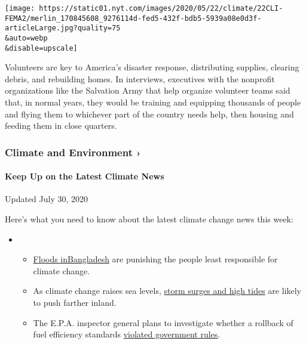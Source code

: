 \texttt{[image: https://static01.nyt.com/images/2020/05/22/climate/22CLI-FEMA2/merlin\_170845608\_9276114d-fed5-432f-bdb5-5939a08e0d3f-articleLarge.jpg?quality=75\\\&auto=webp\\\&disable=upscale]}

Volunteers are key to America's disaster response, distributing
supplies, clearing debris, and rebuilding homes. In interviews,
executives with the nonprofit organizations like the Salvation Army that
help organize volunteer teams said that, in normal years, they would be
training and equipping thousands of people and flying them to whichever
part of the country needs help, then housing and feeding them in close
quarters.

\href{https://www.nytimes.com/section/climate?action=click\&pgtype=Article\&state=default\&region=MAIN_CONTENT_1\&context=storylines_keepup}{}

\hypertarget{climate-and-environment-}{%
\subsubsection{Climate and Environment
›}\label{climate-and-environment-}}

\hypertarget{keep-up-on-the-latest-climate-news}{%
\paragraph{Keep Up on the Latest Climate
News}\label{keep-up-on-the-latest-climate-news}}

Updated July 30, 2020

Here's what you need to know about the latest climate change news this
week:

\begin{itemize}
\item
  \begin{itemize}
  \tightlist
  \item
    \href{https://www.nytimes.com/2020/07/30/climate/bangladesh-floods.html?action=click\&pgtype=Article\&state=default\&region=MAIN_CONTENT_1\&context=storylines_keepup}{Floods
    in}\href{https://www.nytimes.com/2020/07/30/climate/bangladesh-floods.html?action=click\&pgtype=Article\&state=default\&region=MAIN_CONTENT_1\&context=storylines_keepup}{Bangladesh}
    are punishing the people least responsible for climate change.
  \item
    As climate change raises sea levels,
    \href{https://www.nytimes.com/2020/07/30/climate/sea-level-inland-floods.html?action=click\&pgtype=Article\&state=default\&region=MAIN_CONTENT_1\&context=storylines_keepup}{storm
    surges and high tides} are likely to push farther inland.
  \item
    The E.P.A. inspector general plans to investigate whether a rollback
    of fuel efficiency standards
    \href{https://www.nytimes.com/2020/07/27/climate/trump-fuel-efficiency-rule.html?action=click\&pgtype=Article\&state=default\&region=MAIN_CONTENT_1\&context=storylines_keepup}{violated
    government rules}.
  \end{itemize}
\end{itemize}

